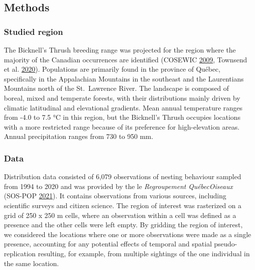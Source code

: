 \documentclass[12pt]{article}
\begin{document}
\hypertarget{methods}{%
\subsection{Methods}\label{methods}}

\hypertarget{studied-region}{%
\subsubsection{Studied region}\label{studied-region}}

The Bicknell's Thrush breeding range was projected for the region where
the majority of the Canadian occurrences are identified (COSEWIC
\protect\hyperlink{ref-cosewic_cosewic_2009}{2009}, Townsend et al.
\protect\hyperlink{ref-billerman_bicknells_2020}{2020}). Populations are
primarily found in the province of Québec, specifically in the
Appalachian Mountains in the southeast and the Laurentians Mountains
north of the St.~Lawrence River. The landscape is composed of boreal,
mixed and temperate forests, with their distributions mainly driven by
climatic latitudinal and elevational gradients. Mean annual temperature
ranges from -4.0 to 7.5 °C in this region, but the Bicknell's Thrush
occupies locations with a more restricted range because of its
preference for high-elevation areas. Annual precipitation ranges from
730 to 950 mm.

\hypertarget{data}{%
\subsubsection{Data}\label{data}}

Distribution data consisted of 6,079 observations of nesting behaviour
sampled from 1994 to 2020 and was provided by the le \emph{Regroupement
QuébecOiseaux} (SOS-POP
\protect\hyperlink{ref-sos-pop_banque_2021}{2021}). It contains
observations from various sources, including scientific surveys and
citizen science. The region of interest was rasterized on a grid of 250
x 250 m cells, where an observation within a cell was defined as a
presence and the other cells were left empty. By gridding the region of
interest, we considered the locations where one or more observations
were made as a single presence, accounting for any potential effects of
temporal and spatial pseudo-replication resulting, for example, from
multiple sightings of the one individual in the same location.
\end{document}
